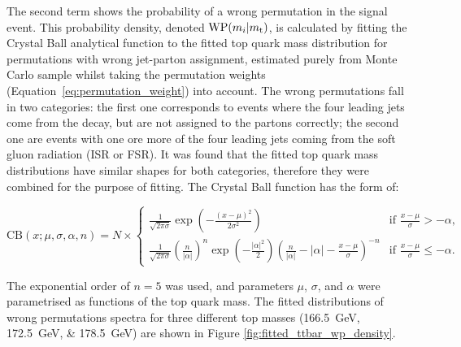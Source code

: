 The second term shows the probability of a wrong permutation in the signal event. This probability density, denoted
$\textrm{WP}(m_i|m_\mathrm{t})$, is calculated by fitting the Crystal Ball analytical function to the fitted top quark mass
distribution for permutations with wrong jet-parton assignment, estimated purely from Monte Carlo \ttbar sample whilst
taking the permutation weights (Equation~\ref{eq:permutation_weight}) into account. The wrong permutations fall in two
categories: the first one corresponds to events where the four leading jets come from the \ttbar decay, but are not
assigned to the partons correctly; the second one are events with one ore more of the four leading jets coming from the
soft gluon radiation (ISR or FSR). It was found that the fitted top quark mass distributions have similar shapes for
both categories, therefore they were combined for the purpose of fitting. The Crystal Ball function has the form of:

\begin{equation}
\textrm{CB}(x;\mu,\sigma,\alpha,n) = N \times
\begin{cases}
\frac{1}{\sqrt{2\pi\sigma}}\exp(-\frac{(x-\mu)^2}{2\sigma^2}) & \text{if $\frac{x-\mu}{\sigma} > -\alpha$,} \\
\frac{1}{\sqrt{2\pi\sigma}}(\frac{n}{|\alpha|})^n
\exp(-\frac{|\alpha|^2}{2})(\frac{n}{|\alpha|}-|\alpha|-\frac{x-\mu}{\sigma})^{-n} & \text{if $\frac{x-\mu}{\sigma}
\leq -\alpha$.}
\end{cases}
\label{eq:crystal_ball}
\end{equation}

The exponential order of $n=\num{5}$ was used, and parameters $\mu$, $\sigma$, and $\alpha$ were parametrised as
functions of the top quark mass. The fitted distributions of wrong permutations spectra for three different top masses
(\SIlist{166.5;172.5;178.5}{\GeV}) are shown in Figure \ref{fig:fitted_ttbar_wp_density}.

